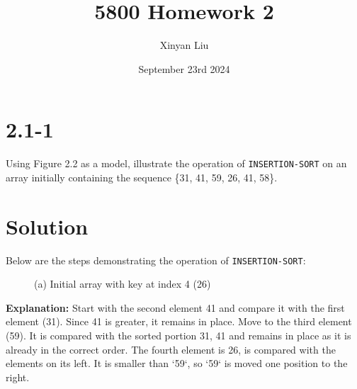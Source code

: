 \documentclass{article}
\title{5800 Homework 2}
\author{Xinyan Liu}
\date{September 23rd 2024}
\begin{document}
\maketitle

\section*{2.1-1}
Using Figure 2.2 as a model, illustrate the operation of \texttt{INSERTION-SORT} on an array initially containing the sequence \{31, 41, 59, 26, 41, 58\}.

\section*{Solution}
Below are the steps demonstrating the operation of \texttt{INSERTION-SORT}:

\begin{figure}[h!]
    \centering
    \caption{(a) Initial array with key at index 4 (26)}
\end{figure}

\textbf{Explanation:} Start with the second element 41 and compare it with the first element (31). Since 41 is greater, it remains in place. Move to the third element (59). It is compared with the sorted portion {31, 41} and remains in place as it is already in the correct order. The fourth element is 26, is compared with the elements on its left. It is smaller than `59`, so `59` is moved one position to the right.
\end{document}
